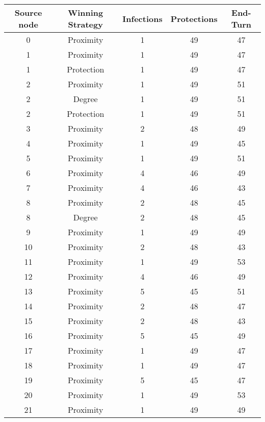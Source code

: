 \documentclass[results.tex]{subfiles}
\begin{document}
\begin{center}
  \begin{tabular}{| c || c | c | c | c |}
    \hline
    {\bfseries Source node} & {\bfseries Winning Strategy} & {\bfseries Infections} & {\bfseries Protections} & {\bfseries End-Turn} \\  %
    \hline\hline
    0 & Proximity & 1 & 49 & 47 \\ 
    \hline
    1 & Proximity & 1 & 49 & 47 \\ 
    \hline
    1 & Protection & 1 & 49 & 47 \\ 
    \hline
    2 & Proximity & 1 & 49 & 51 \\ 
    \hline
    2 & Degree & 1 & 49 & 51 \\ 
    \hline
    2 & Protection & 1 & 49 & 51 \\ 
    \hline
    3 & Proximity & 2 & 48 & 49 \\ 
    \hline
    4 & Proximity & 1 & 49 & 45 \\ 
    \hline
    5 & Proximity & 1 & 49 & 51 \\ 
    \hline
    6 & Proximity & 4 & 46 & 49 \\ 
    \hline
    7 & Proximity & 4 & 46 & 43 \\ 
    \hline
    8 & Proximity & 2 & 48 & 45 \\ 
    \hline
    8 & Degree & 2 & 48 & 45 \\ 
    \hline
    9 & Proximity & 1 & 49 & 49 \\ 
    \hline
    10 & Proximity & 2 & 48 & 43 \\ 
    \hline
    11 & Proximity & 1 & 49 & 53 \\ 
    \hline
    12 & Proximity & 4 & 46 & 49 \\ 
    \hline
    13 & Proximity & 5 & 45 & 51 \\ 
    \hline
    14 & Proximity & 2 & 48 & 47 \\ 
    \hline
    15 & Proximity & 2 & 48 & 43 \\ 
    \hline
    16 & Proximity & 5 & 45 & 49 \\ 
    \hline
    17 & Proximity & 1 & 49 & 47 \\ 
    \hline
    18 & Proximity & 1 & 49 & 47 \\ 
    \hline
    19 & Proximity & 5 & 45 & 47 \\ 
    \hline
    20 & Proximity & 1 & 49 & 53 \\ 
    \hline
    21 & Proximity & 1 & 49 & 49 \\ 

\end{tabular}
\end{center}
\end{document}
